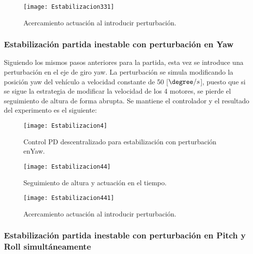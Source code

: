 \documentclass[\main/main.tex]{subfiles}
\begin{document}
\begin{figure}[H]
\noindent \begin{centering}
\texttt{[image: Estabilizacion331]}
\par\end{centering}
\caption{Acercamiento actuación al introducir perturbación.}
\end{figure}

\subsubsection{Estabilización partida inestable con perturbación en Yaw}

Siguiendo los mismos pasos anteriores para la partida, esta vez se
introduce una perturbación en el eje de giro yaw. La perturbación
se simula modificando la posición yaw del vehículo a velocidad constante
de 50 {[}$\degree/s${]}, puesto que si se sigue la estrategia
de modificar la velocidad de los 4 motores, se pierde el seguimiento
de altura de forma abrupta. Se mantiene el controlador y el resultado
del experimento es el siguiente:

\begin{figure}[H]
\noindent \begin{centering}
\texttt{[image: Estabilizacion4]}
\par\end{centering}
\caption{Control PD descentralizado para estabilización con perturbación enYaw.}
\end{figure}


\begin{figure}[H]
\noindent \begin{centering}
\texttt{[image: Estabilizacion44]}
\par\end{centering}
\caption{Seguimiento de altura y actuación en el tiempo.}
\end{figure}

\begin{figure}[H]
\noindent \begin{centering}
\texttt{[image: Estabilizacion441]}
\par\end{centering}
\caption{Acercamiento actuación al introducir perturbación.}
\end{figure}

\subsubsection{Estabilización partida inestable con perturbación en Pitch y Roll
simultáneamente}
\end{document}
